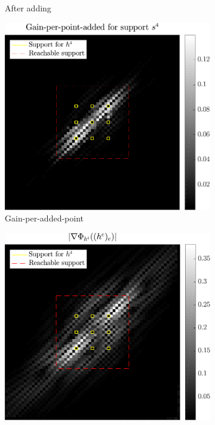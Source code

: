\begin{figure}[!ht]
\begin{subfigure}[b]{0.32\linewidth}
\caption{After adding}
\end{subfigure}
\begin{subfigure}[b]{0.32\linewidth}\centering
\includegraphics[width=\linewidth]{figures/before_after/xp_128x128_sc2_angl1_K3_S3_node4before_objmatrix.pdf}
\caption{Gain-per-added-point} \label{fig_gain_matrix}
\end{subfigure}
\begin{subfigure}[b]{0.32\linewidth}\centering
\includegraphics[width=\linewidth]{figures/before_after/xp_128x128_sc2_angl1_K3_S3_node4before_partgrad4.pdf}

\end{subfigure}
\end{figure}

